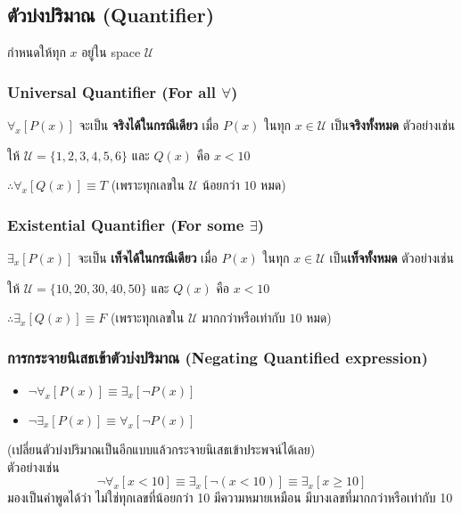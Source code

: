 \documentclass[12pt,a4paper]{article}
\begin{document}
\subsection*{ตัวบ่งปริมาณ (Quantifier)}
\quad กำหนดให้ทุก $x$ อยู่ใน space $\mathcal{U}$

\subsubsection*{Universal Quantifier (For all $\forall$)}
$\forall_x\left[ P(x) \right]$ จะเป็น \textbf{จริงได้ในกรณีเดียว} เมื่อ $P(x)$ ในทุก $x \in \mathcal{U}$ เป็น\textbf{จริงทั้งหมด} ตัวอย่างเช่น \\
\rule{0pt}{2.5ex}

ให้ $\mathcal{U} = \{1,2,3,4,5,6\}$ และ $Q(x)$ คือ $x < 10$\\
\rule{0pt}{4ex}
$\therefore \forall_x[Q(x)] \equiv T$ (เพราะทุกเลขใน $\mathcal{U}$ น้อยกว่า $10$ หมด)

\subsubsection*{Existential Quantifier (For some $\exists$)}
$\exists_x\left[ P(x) \right]$ จะเป็น \textbf{เท็จได้ในกรณีเดียว} เมื่อ $P(x)$ ในทุก $x \in \mathcal{U}$ เป็น\textbf{เท็จทั้งหมด} ตัวอย่างเช่น \\
\rule{0pt}{2.5ex}

ให้ $\mathcal{U} = \{10,20,30,40,50\}$ และ $Q(x)$ คือ $x < 10$\\
\rule{0pt}{4ex}
$\therefore \exists_x[Q(x)] \equiv F$ (เพราะทุกเลขใน $\mathcal{U}$ มากกว่าหรือเท่ากับ $10$ หมด)

\subsubsection*{การกระจายนิเสธเข้าตัวบ่งปริมาณ (Negating Quantified expression)}
\begin{itemize}
    \item $\neg\forall_x[P(x)] \equiv \exists_x[\neg P(x)]$
    \item $\neg\exists_x[P(x)] \equiv \forall_x[\neg P(x)]$
\end{itemize}
(เปลี่ยนตัวบ่งปริมาณเป็นอีกแบบแล้วกระจายนิเสธเข้าประพจน์ได้เลย) \\
ตัวอย่างเช่น \\
$$
    \neg \forall_x[x < 10] \equiv \exists_x[\neg( x < 10)] \equiv \exists_x[x \ge 10]
$$
มองเป็นคำพูดได้ว่า ไม่ใช่ทุกเลขที่น้อยกว่า 10 มีความหมายเหมือน มีบางเลขที่มากกว่าหรือเท่ากับ 10
\end{document}
